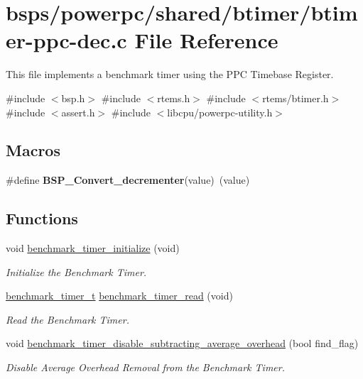 \hypertarget{btimer-ppc-dec_8c}{}\section{bsps/powerpc/shared/btimer/btimer-\/ppc-\/dec.c File Reference}
\label{btimer-ppc-dec_8c}


This file implements a benchmark timer using the P\+PC Timebase Register.  


{\ttfamily \#include $<$bsp.\+h$>$}\newline
{\ttfamily \#include $<$rtems.\+h$>$}\newline
{\ttfamily \#include $<$rtems/btimer.\+h$>$}\newline
{\ttfamily \#include $<$assert.\+h$>$}\newline
{\ttfamily \#include $<$libcpu/powerpc-\/utility.\+h$>$}\newline
\subsection*{Macros}
\begin{DoxyCompactItemize}
\item 
\mbox{\label{btimer-ppc-dec_8c_a84d983ee3570e017a50ec2e1f9888e90}} 
\#define {\bfseries B\+S\+P\+\_\+\+Convert\+\_\+decrementer}(value)~(value)
\end{DoxyCompactItemize}
\subsection*{Functions}
\begin{DoxyCompactItemize}
\item 
void \mbox{\hyperlink{btimer-ppc-dec_8c_a9ba0ae2fd8880801fb86979a16cd3b2b}{benchmark\+\_\+timer\+\_\+initialize}} (void)
\begin{DoxyCompactList}\small\item\em Initialize the Benchmark Timer. \end{DoxyCompactList}\item 
\mbox{\hyperlink{btimer_8h_ac0f944fe3193b01df09c3d3a5a677e5a}{benchmark\+\_\+timer\+\_\+t}} \mbox{\hyperlink{btimer-ppc-dec_8c_ab8dc8517e97918d293d78e85b9454855}{benchmark\+\_\+timer\+\_\+read}} (void)
\begin{DoxyCompactList}\small\item\em Read the Benchmark Timer. \end{DoxyCompactList}\item 
void \mbox{\hyperlink{btimer-ppc-dec_8c_af3b4e28a2f0f7870be848a1d5cee0d03}{benchmark\+\_\+timer\+\_\+disable\+\_\+subtracting\+\_\+average\+\_\+overhead}} (bool find\+\_\+flag)
\begin{DoxyCompactList}\small\item\em Disable Average Overhead Removal from the Benchmark Timer. \end{DoxyCompactList}\end{DoxyCompactItemize}
